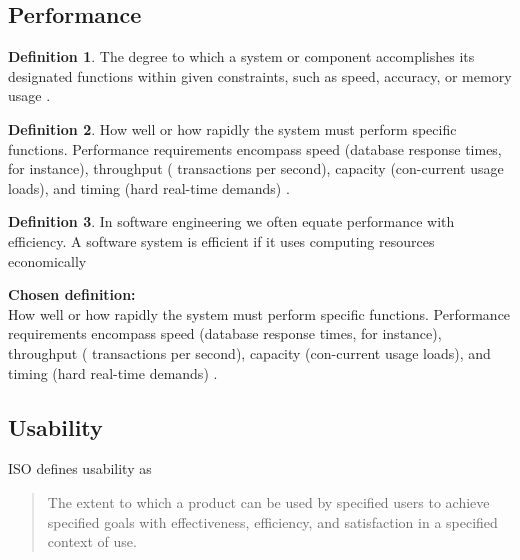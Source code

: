 \documentclass[letterpaper,cleveref]{lipics-v2019}
\theoremstyle{definition}
\newtheorem{defn}{Definition}
\begin{document}
\subsection{Performance}
\begin{defn}
The degree to which a system or component accomplishes its designated functions within given constraints, such as speed, accuracy, or memory usage \cite{IEEEStdGlossarySET1990}.\\
\end{defn}
\begin{defn}
How well or how rapidly the system must perform specific functions. Performance requirements encompass speed (database response times, for instance), throughput ( transactions per second), capacity (con-current usage loads), and timing (hard real-time demands) \cite{wiegers2003softreq}.
\end{defn}
\begin{defn}
In software engineering we often equate performance with efficiency. A software system is efficient if it uses computing resources economically \cite{ghezzi1991fundamentals}\\
\end{defn}

\textbf{Chosen definition:}\\
How well or how rapidly the system must perform specific functions. Performance requirements encompass speed (database response times, for instance), throughput ( transactions per second), capacity (con-current usage loads), and timing (hard real-time demands) \cite{wiegers2003softreq}.\\


\subsection{Usability}

ISO defines usability as
\begin{quote}
The extent to which a product can be used by specified users to achieve
specified goals with effectiveness, efficiency, and satisfaction in a specified
context of use.
\end{quote}
\end{document}
